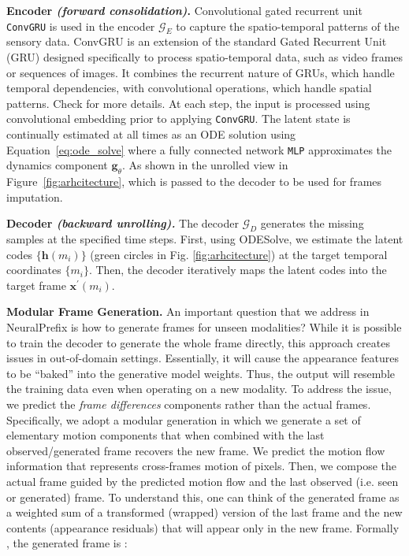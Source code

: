\documentclass[10pt, conference, compsocconf]{IEEEtran}
\def\update#1{#1}
\begin{document}
\textbf{Encoder \textit{(forward consolidation)}.} Convolutional gated recurrent unit \texttt{ConvGRU} is used in the encoder $\mathcal{G}_{E}$ to capture the spatio-temporal patterns of the sensory data. \update{ConvGRU is an extension of the standard Gated Recurrent Unit (GRU) designed specifically to process spatio-temporal data, such as video frames or sequences of images. It combines the recurrent nature of GRUs, which handle temporal dependencies, with convolutional operations, which handle spatial patterns. Check \cite{ballas2015delving} for more details.} At each \update{step,} the input is processed using convolutional embedding prior to applying  \texttt{ConvGRU}. The latent state is continually estimated at all times as an ODE solution using Equation~\eqref{eq:ode_solve} where a fully connected network \texttt{MLP} approximates the dynamics component $\mathbf{g}_\theta$. As shown in the unrolled view in Figure~\ref{fig:arhcitecture},  which is passed to the decoder to be used for frames imputation. 



\textbf{Decoder \textit{(backward unrolling).}} The decoder $\mathcal{G}_D$
generates the missing samples at the specified time steps. First, using ODESolve, we  estimate the latent codes $\big\{ \mathbf{h}(m_i) \big\}$ (green circles in Fig. \ref{fig:arhcitecture}) at the target temporal coordinates $\big\{ m_i \big\}$.   Then, the decoder iteratively maps the latent codes into the target frame $\mathbf{x}^\prime(m_i)$.  


\textbf{Modular Frame Generation.} An important question that we address in NeuralPrefix is how to generate frames for unseen modalities? While it is possible to train the decoder to generate the whole frame directly, this approach creates issues in out-of-domain \update{settings}. Essentially, it will cause the appearance features to be ``baked'' into the generative model weights. Thus, the output will resemble the training data even when operating on \update{a new} modality. To address the issue, we predict the \textit{frame differences} components rather than the actual frames. 
Specifically, we adopt a modular generation in which we generate a set of elementary motion components that when combined with the last observed/generated frame recovers the new frame. 
We predict the motion flow information that represents cross-frames motion of pixels. \update{Then,} we compose the actual frame guided by the predicted motion flow and the last observed (i.e. seen or generated) frame.  To understand this, one can think of the generated frame as a weighted sum of a transformed (wrapped) version of the last frame and the new contents (appearance residuals) that will appear only in the new frame. Formally \cite{shen2024ladder, yu2022deep}, the generated frame is :
\end{document}
